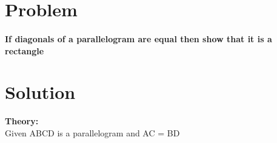 \documentclass[10pt, a4paper]{article}
\begin{document}
\title{\mytitle}
\author{\myauthor\hspace{1em}\\\contact\\FWC22008\hspace{6.5em}IITH\hspace{0.5em}\mymodule\hspace{6em}ASSIGN-4}
\date{}
	\maketitle
		
	\tableofcontents
\vspace{5mm}
   \section{Problem}
\paragraph{ If diagonals of a parallelogram are equal then show that it is a rectangle }
   \section{Solution}
   \textbf{Theory:}\\

   Given  ABCD is a parallelogram and AC = BD \\ 
\end{document}

